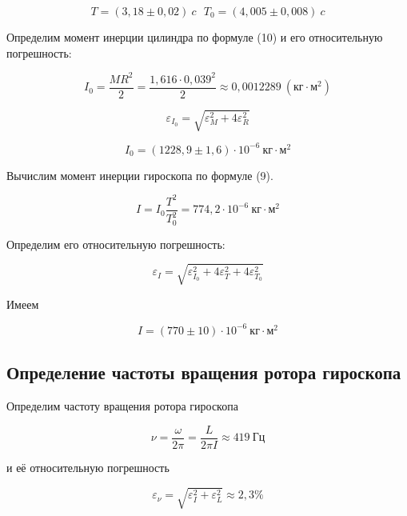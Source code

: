 \documentclass{article}
\begin{document}
\begin{equation}
	T = (3,18 \pm 0,02) \ c \ \ \ T_0 = (4,005 \pm 0,008) \ c
\end{equation}

Определим момент инерции цилиндра по формуле (10) и его относительную погрешность:

\begin{equation}
	I_0 = \frac{M R^2}{2} = \frac{1,616 \cdot 0,039^2}{2} \approx 0,0012289 \ (кг \cdot м^2)
\end{equation}

\begin{equation}
	\varepsilon_{I_0} =\sqrt{ \varepsilon_M^2 + 4 \varepsilon_R^2 }
\end{equation}

\begin{equation}
	I_0 = (1228,9 \pm 1,6) \cdot 10^{-6} \ кг \cdot м^2
\end{equation}

Вычислим момент инерции гироскопа по формуле (9). 

\begin{equation}
	I = I_0 \frac{T^2}{T_0^2} = 774,2 \cdot 10^{-6} \ кг \cdot м^2
\end{equation}

Определим его относительную погрешность:

\begin{equation}
	\varepsilon_{I} =\sqrt{ \varepsilon_{I_0}^2 + 4 \varepsilon_T^2 + 4 \varepsilon_{T_0}^2}
\end{equation}

Имеем 

\begin{equation}
	I =  (770 \pm 10) \cdot 10^{-6} \ кг \cdot м^2
\end{equation}

\subsection*{Определение частоты вращения ротора гироскопа}

Определим частоту вращения ротора гироскопа

\begin{equation}
	\nu = \frac{\omega}{2 \pi} = \frac{L}{2 \pi I} \approx 419 \ Гц
\end{equation}

и её относительную погрешность

\begin{equation}
	\varepsilon_{\nu} = \sqrt{ \varepsilon_{I}^2 +  \varepsilon_L^2 } \approx 2,3 \%
\end{equation}
\end{document}
